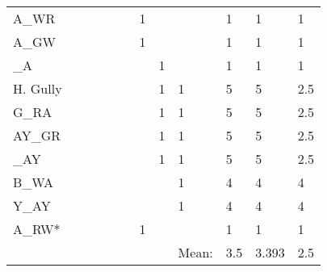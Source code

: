 \documentclass[a4paper,12pt]{article}
\begin{document}
\begin{table}[ht]
\begin{tabular}{|l|llllllll|lll|}
  A\_WR &  &  &  &  &  & 1 &  &  & 1 & 1 & 1 \\ 
  A\_GW &  &  &  &  &  & 1 &  &  & 1 & 1 & 1 \\ 
  \_A &  &  &  &  &  &  & 1 &  & 1 & 1 & 1 \\ 
  H. Gully &  &  &  &  &  &  & 1 & 1 & 5 & 5 & 2.5 \\ 
  G\_RA &  &  &  &  &  &  & 1 & 1 & 5 & 5 & 2.5 \\ 
  AY\_GR &  &  &  &  &  &  & 1 & 1 & 5 & 5 & 2.5 \\ 
  \_AY &  &  &  &  &  &  & 1 & 1 & 5 & 5 & 2.5 \\ 
  B\_WA &  &  &  &  &  &  &  & 1 & 4 & 4 & 4 \\ 
  Y\_AY &  &  &  &  &  &  &  & 1 & 4 & 4 & 4 \\ 
  A\_RW* &  &  &  &  &  & 1 &  &  & 1 & 1 & 1 \\ 
  \hline
   &  &  &  &  &  &  &  & Mean: & 3.5 & 3.393 & 2.5 \\ 
   \hline
\end{tabular}
\end{table}

\clearpage
\end{document}
